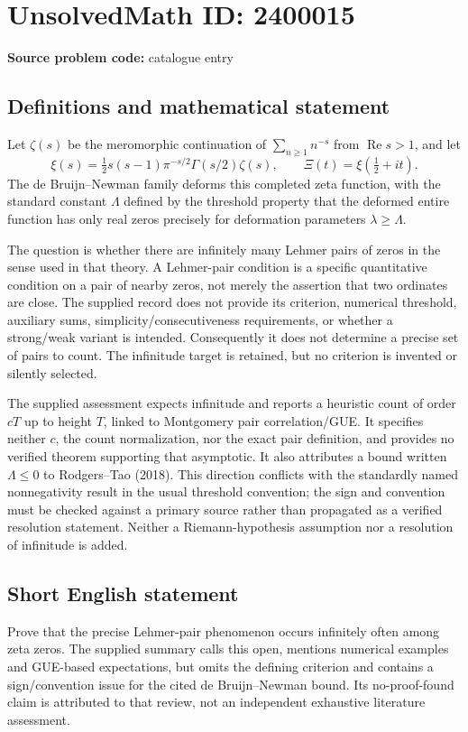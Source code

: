 \documentclass[11pt]{article}
\begin{document}
\section*{UnsolvedMath ID: 2400015}
\textbf{Source problem code:} catalogue entry
\subsection{Definitions and mathematical statement}
Let $\zeta(s)$ be the meromorphic continuation of $\sum_{n\geq1}n^{-s}$ from $\operatorname{Re}s>1$, and let
\[
 \xi(s)=\tfrac12s(s-1)\pi^{-s/2}\Gamma(s/2)\zeta(s),\qquad
 \Xi(t)=\xi(\tfrac12+it).
\]
The de Bruijn--Newman family deforms this completed zeta function, with the standard constant $\Lambda$ defined by the threshold property that the deformed entire function has only real zeros precisely for deformation parameters $\lambda\geq\Lambda$.

The question is whether there are infinitely many Lehmer pairs of zeros in the sense used in that theory. A Lehmer-pair condition is a specific quantitative condition on a pair of nearby zeros, not merely the assertion that two ordinates are close. The supplied record does not provide its criterion, numerical threshold, auxiliary sums, simplicity/consecutiveness requirements, or whether a strong/weak variant is intended. Consequently it does not determine a precise set of pairs to count. The infinitude target is retained, but no criterion is invented or silently selected.

The supplied assessment expects infinitude and reports a heuristic count of order $cT$ up to height $T$, linked to Montgomery pair correlation/GUE. It specifies neither $c$, the count normalization, nor the exact pair definition, and provides no verified theorem supporting that asymptotic. It also attributes a bound written $\Lambda\leq0$ to Rodgers--Tao (2018). This direction conflicts with the standardly named nonnegativity result in the usual threshold convention; the sign and convention must be checked against a primary source rather than propagated as a verified resolution statement. Neither a Riemann-hypothesis assumption nor a resolution of infinitude is added.
\subsection{Short English statement}
Prove that the precise Lehmer-pair phenomenon occurs infinitely often among zeta zeros. The supplied summary calls this open, mentions numerical examples and GUE-based expectations, but omits the defining criterion and contains a sign/convention issue for the cited de Bruijn--Newman bound. Its no-proof-found claim is attributed to that review, not an independent exhaustive literature assessment.
\end{document}
